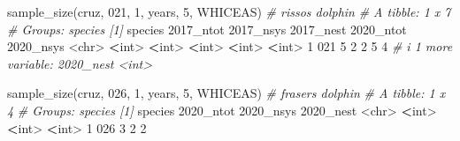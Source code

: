\documentclass[
]{book}
\newenvironment{Shaded}{\begin{snugshade}}{\end{snugshade}}
\newcommand{\AttributeTok}[1]{\textcolor[rgb]{0.77,0.63,0.00}{#1}}
\newcommand{\CommentTok}[1]{\textcolor[rgb]{0.56,0.35,0.01}{\textit{#1}}}
\newcommand{\DecValTok}[1]{\textcolor[rgb]{0.00,0.00,0.81}{#1}}
\newcommand{\ErrorTok}[1]{\textcolor[rgb]{0.64,0.00,0.00}{\textbf{#1}}}
\newcommand{\FunctionTok}[1]{\textcolor[rgb]{0.00,0.00,0.00}{#1}}
\newcommand{\NormalTok}[1]{#1}
\newcommand{\SpecialCharTok}[1]{\textcolor[rgb]{0.00,0.00,0.00}{#1}}
\newcommand{\StringTok}[1]{\textcolor[rgb]{0.31,0.60,0.02}{#1}}
\begin{document}
\begin{Shaded}
\begin{Highlighting}[]
\FunctionTok{sample\_size}\NormalTok{(cruz, }\StringTok{\textquotesingle{}021\textquotesingle{}}\NormalTok{, }\DecValTok{1}\NormalTok{, years, }\DecValTok{5}\NormalTok{, }\StringTok{\textquotesingle{}WHICEAS\textquotesingle{}}\NormalTok{) }\CommentTok{\# risso\textquotesingle{}s dolphin}
\CommentTok{\# A tibble: 1 x 7}
\CommentTok{\# Groups:   species [1]}
\NormalTok{  species }\StringTok{\textasciigrave{}}\AttributeTok{2017\_ntot}\StringTok{\textasciigrave{}} \StringTok{\textasciigrave{}}\AttributeTok{2017\_nsys}\StringTok{\textasciigrave{}} \StringTok{\textasciigrave{}}\AttributeTok{2017\_nest}\StringTok{\textasciigrave{}} \StringTok{\textasciigrave{}}\AttributeTok{2020\_ntot}\StringTok{\textasciigrave{}} \StringTok{\textasciigrave{}}\AttributeTok{2020\_nsys}\StringTok{\textasciigrave{}}
  \SpecialCharTok{\textless{}}\NormalTok{chr}\SpecialCharTok{\textgreater{}}         \ErrorTok{\textless{}}\NormalTok{int}\SpecialCharTok{\textgreater{}}       \ErrorTok{\textless{}}\NormalTok{int}\SpecialCharTok{\textgreater{}}       \ErrorTok{\textless{}}\NormalTok{int}\SpecialCharTok{\textgreater{}}       \ErrorTok{\textless{}}\NormalTok{int}\SpecialCharTok{\textgreater{}}       \ErrorTok{\textless{}}\NormalTok{int}\SpecialCharTok{\textgreater{}}
\DecValTok{1} \DecValTok{021}               \DecValTok{5}           \DecValTok{2}           \DecValTok{2}           \DecValTok{5}           \DecValTok{4}
\CommentTok{\# i 1 more variable: \textasciigrave{}2020\_nest\textasciigrave{} \textless{}int\textgreater{}}

\FunctionTok{sample\_size}\NormalTok{(cruz, }\StringTok{\textquotesingle{}026\textquotesingle{}}\NormalTok{, }\DecValTok{1}\NormalTok{, years, }\DecValTok{5}\NormalTok{, }\StringTok{\textquotesingle{}WHICEAS\textquotesingle{}}\NormalTok{) }\CommentTok{\# fraser\textquotesingle{}s dolphin}
\CommentTok{\# A tibble: 1 x 4}
\CommentTok{\# Groups:   species [1]}
\NormalTok{  species }\StringTok{\textasciigrave{}}\AttributeTok{2020\_ntot}\StringTok{\textasciigrave{}} \StringTok{\textasciigrave{}}\AttributeTok{2020\_nsys}\StringTok{\textasciigrave{}} \StringTok{\textasciigrave{}}\AttributeTok{2020\_nest}\StringTok{\textasciigrave{}}
  \SpecialCharTok{\textless{}}\NormalTok{chr}\SpecialCharTok{\textgreater{}}         \ErrorTok{\textless{}}\NormalTok{int}\SpecialCharTok{\textgreater{}}       \ErrorTok{\textless{}}\NormalTok{int}\SpecialCharTok{\textgreater{}}       \ErrorTok{\textless{}}\NormalTok{int}\SpecialCharTok{\textgreater{}}
\DecValTok{1} \DecValTok{026}               \DecValTok{3}           \DecValTok{2}           \DecValTok{2}


\end{Highlighting}
\end{Shaded}
\end{document}
